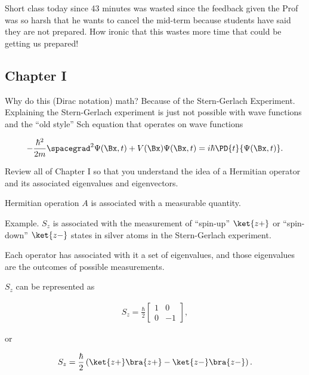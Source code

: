 %
%

Short class today since 43 minutes was wasted since the feedback given the Prof was so harsh that he wants to cancel the mid-term because students have said they are not prepared.  How ironic that this wastes more time that could be getting us prepared!

\subsection{Chapter I}

Why do this (Dirac notation) math?  Because of the Stern-Gerlach Experiment.  Explaining the Stern-Gerlach experiment is just not possible with wave functions and the ``old style'' Sch equation that operates on wave functions

\begin{align}\label{eqn:PHY356Foct26:100}
- \frac{\hbar^2}{2m} \spacegrad^2 \Psi(\Bx,t) + V(\Bx) \Psi(\Bx,t) = i \hbar \PD{t}{\Psi(\Bx,t)}.
\end{align}

Review all of Chapter I so that you understand the idea of a Hermitian operator and its associated eigenvalues and eigenvectors.

Hermitian operation $A$ is associated with a measurable quantity.

Example.  $S_z$ is associated with the measurement of ``spin-up'' $\ket{z+}$ or ``spin-down'' $\ket{z-}$ states in silver atoms in the Stern-Gerlach experiment.

Each operator has associated with it a set of eigenvalues, and those eigenvalues are the outcomes of possible measurements.

$S_z$ can be represented as

\begin{align}\label{eqn:PHY356Foct26:101}
S_z = \frac{\hbar}{2}
\begin{bmatrix}
1 & 0 \\
0 & -1
\end{bmatrix},
\end{align}

or

\begin{align}\label{eqn:PHY356Foct26:102}
S_z = \frac{\hbar}{2}
\left( \ket{z+}\bra{z+} - \ket{z-}\bra{z-} \right).
\end{align}

